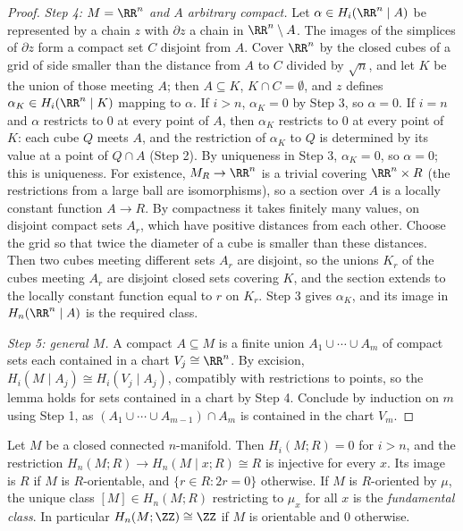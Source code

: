 \begin{proof}
\emph{Step 4: $M = \RR^n$ and $A$ arbitrary compact.} Let $\alpha \in H_i(\RR^n \mid A)$ be represented by a chain $z$ with $\partial z$ a chain in $\RR^n \setminus A$. The images
of the simplices of $\partial z$ form a compact set $C$ disjoint from $A$. Cover $\RR^n$ by the closed cubes of a grid of side smaller than the distance from $A$ to $C$
divided by $\sqrt{n}$, and let $K$ be the union of those meeting $A$; then $A \subseteq K$, $K \cap C = \emptyset$, and $z$ defines $\alpha_K \in H_i(\RR^n \mid K)$ mapping to
$\alpha$. If $i > n$, $\alpha_K = 0$ by Step 3, so $\alpha = 0$. If $i = n$ and $\alpha$ restricts to $0$ at every point of $A$, then $\alpha_K$ restricts to $0$ at every point
of $K$: each cube $Q$ meets $A$, and the restriction of $\alpha_K$ to $Q$ is determined by its value at a point of $Q \cap A$ (Step 2). By uniqueness in Step 3,
$\alpha_K = 0$, so $\alpha = 0$; this is uniqueness. For existence, $M_R \to \RR^n$ is a trivial covering $\RR^n \times R$ (the restrictions from a large ball are
isomorphisms), so a section over $A$ is a locally constant function $A \to R$. By compactness it takes finitely many values, on disjoint compact sets $A_r$, which have
positive distances from each other. Choose the grid so that twice the diameter of a cube is smaller than these distances. Then two cubes meeting different sets $A_r$ are
disjoint, so the unions $K_r$ of the cubes meeting $A_r$ are disjoint closed sets covering $K$, and the section extends to the locally constant function equal to $r$ on
$K_r$. Step 3 gives $\alpha_K$, and its image in $H_n(\RR^n \mid A)$ is the required class.

\emph{Step 5: general $M$.} A compact $A \subseteq M$ is a finite union $A_1 \cup \cdots \cup A_m$ of compact sets each contained in a chart $V_j \cong \RR^n$. By excision,
$H_i(M \mid A_j) \cong H_i(V_j \mid A_j)$, compatibly with restrictions to points, so the lemma holds for sets contained in a chart by Step 4. Conclude by induction on
$m$ using Step 1, as $(A_1 \cup \cdots \cup A_{m-1}) \cap A_m$ is contained in the chart $V_m$.
\end{proof}

\begin{theorem}\label{poincare-duality:theorem-fundamental-class}
Let $M$ be a closed connected $n$-manifold. Then $H_i(M; R) = 0$ for $i > n$, and the restriction $H_n(M; R) \to H_n(M \mid x; R) \cong R$ is injective for every $x$. Its
image is $R$ if $M$ is $R$-orientable, and $\{r \in R : 2r = 0\}$ otherwise. If $M$ is $R$-oriented by $\mu$, the unique class $[M] \in H_n(M; R)$ restricting to $\mu_x$
for all $x$ is the \emph{fundamental class}. In particular $H_n(M; \ZZ) \cong \ZZ$ if $M$ is orientable and $0$ otherwise.
\end{theorem}

